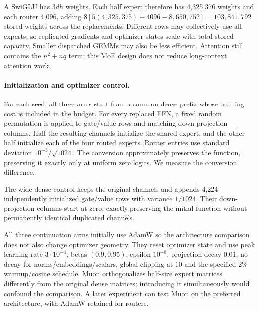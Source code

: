\documentclass[11pt]{article}
\begin{document}
A SwiGLU has $3dh$ weights. Each half expert therefore has 4,325,376 weights and each router 4,096, adding $8[5(4{,}325{,}376)+4096-8{,}650{,}752]=103{,}841{,}792$ stored weights across the replacements. Different rows may collectively use all experts, so replicated gradients and optimizer states scale with total stored capacity. Smaller dispatched GEMMs may also be less efficient. Attention still contains the $n^2+nq$ term; this MoE design does not reduce long-context attention work.

\paragraph{Initialization and optimizer control.}
For each seed, all three arms start from a common dense prefix whose training cost is included in the budget. For every replaced FFN, a fixed random permutation is applied to gate/value rows and matching down-projection columns. Half the resulting channels initialize the shared expert, and the other half initialize each of the four routed experts. Router entries use standard deviation $10^{-3}/\sqrt{1024}$. The conversion approximately preserves the function, preserving it exactly only at uniform zero logits. We measure the conversion difference.

The wide dense control keeps the original channels and appends 4,224 independently initialized gate/value rows with variance $1/1024$. Their down-projection columns start at zero, exactly preserving the initial function without permanently identical duplicated channels.

All three continuation arms initially use AdamW so the architecture comparison does not also change optimizer geometry. They reset optimizer state and use peak learning rate $3\cdot10^{-4}$, betas $(0.9,0.95)$, epsilon $10^{-8}$, projection decay 0.01, no decay for norms/embeddings/scalars, global clipping at 10 and the specified 2\% warmup/cosine schedule. Muon orthogonalizes half-size expert matrices differently from the original dense matrices; introducing it simultaneously would confound the comparison. A later experiment can test Muon on the preferred architecture, with AdamW retained for routers.
\end{document}
